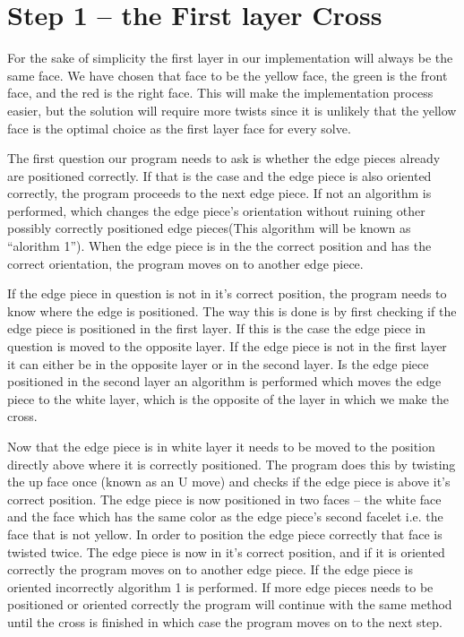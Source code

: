 \section{Step 1 -- the First layer Cross}
For the sake of simplicity the first layer in our implementation will always be the same face. We have chosen that face to be the yellow face, the green is the front face, and the red is the right face. This will make the implementation process easier, but the solution will require more twists since it is unlikely that the yellow face is the optimal choice as the first layer face for every solve.

The first question our program needs to ask is whether the edge pieces already are positioned correctly. If that is the case and the edge piece is also oriented correctly, the program proceeds to the next edge piece. If not an algorithm is performed, which changes the edge piece's orientation without ruining other possibly correctly positioned edge pieces(This algorithm will be known as "`alorithm 1"'). When the edge piece is in the the correct position and has the correct orientation, the program moves on to another edge piece. 

If the edge piece in question is not in it's correct position, the program needs to know where the edge is positioned. 
The way this is done is by first checking if the edge piece is positioned in the first layer. 
If this is the case the edge piece in question is moved to the opposite layer. 
If the edge piece is not in the first layer it can either be in the opposite layer or in the second layer.
Is the edge piece positioned in the second layer an algorithm is performed which moves the edge piece to the white layer, which is the opposite of the layer in which we make the cross.

Now that the edge piece is in white layer it needs to be moved to the position directly above where it is correctly positioned. 
The program does this by twisting the up face once (known as an U move) and checks if the edge piece is above it's correct position.
The edge piece is now positioned in two faces -- the white face and the face which has the same color as the edge piece's second facelet i.e. the face that is not yellow.
In order to position the edge piece correctly that face is twisted twice.
The edge piece is now in it's correct position, and if it is oriented correctly the program moves on to another edge piece.
If the edge piece is oriented incorrectly algorithm 1 is performed. If more edge pieces needs to be positioned or oriented correctly the program will continue with the same method until the cross is finished in which case the program moves on to the next step.

